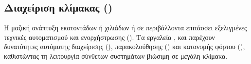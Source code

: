 \subsection{Διαχείριση κλίμακας ()}

Η μαζική ανάπτυξη εκατοντάδων ή χιλιάδων  ή  σε περιβάλλοντα  επιτάσσει εξελιγμένες τεχνικές αυτοματισμού και ενορχήστρωσης (). Τα εργαλεία ,  και  παρέχουν δυνατότητες αυτόματης διαχείρισης (), παρακολούθησης () και κατανομής φόρτου (), καθιστώντας τη λειτουργία σύνθετων συστημάτων βιώσιμη σε μεγάλη κλίμακα.







